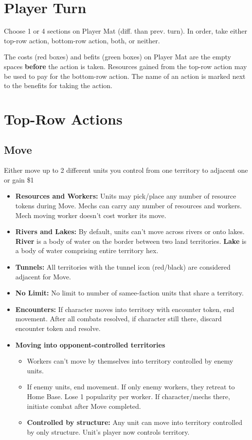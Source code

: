 \documentclass[12pt]{article}
\newenvironment{itemizeCustom}
{\begin{itemize}
  \setlength{\itemsep}{1pt}
  \setlength{\parskip}{0pt}
  \setlength{\parsep}{0pt}}
{\end{itemize}}
\begin{document}
\begin{multicols*}{2}
\section*{Player Turn}
Choose 1 or 4 sections on Player Mat (diff. than prev. turn). In order, take either top-row action, bottom-row action, both, or neither.

The costs (red boxes) and befits (green boxes) on Player Mat are the empty spaces \textbf{before} the action is taken. Resources gained from the top-row action may be used to pay for the bottom-row action. The name of an action is marked next to the benefits for taking the action.

\section*{Top-Row Actions}
\subsection*{Move}
Either move up to 2 different units you control from one territory to adjacent one or gain \$1

\begin{itemizeCustom}
    \item \textbf{Resources and Workers:} Units may pick/place any number of resource tokens during Move. Mechs can carry any number of resources and workers. Mech moving worker doesn't cost worker its move.
    \item \textbf{Rivers and Lakes:}  By default, units can't move across rivers or onto lakes. \textbf{River} is a body of water on the border between two land territories. \textbf{Lake} is a body of water comprising entire territory hex.
    \item \textbf{Tunnels:} All territories with the tunnel icon (red/black) are considered adjacent for Move.
    \item \textbf{No Limit:} No limit to number of samee-faction units that share a territory.
    \item \textbf{Encounters:} If character moves into territory with encounter token, end movement. After all combats resolved, if character still there, discard encounter token and resolve.
    \item \textbf{Moving into opponent-controlled territories}
        \begin{itemizeCustom}
            \item Workers can't move by themselves into territory controlled by enemy units.
            \item If enemy units, end movement. If only enemy workers, they retreat to Home Base. Lose 1 popularity per worker. If character/mechs there, initiate combat after Move completed.
            \item \textbf{Controlled by structure:} Any unit can move into territory controlled by only structure. Unit's player now controls territory.
        \end{itemizeCustom}
\end{itemizeCustom}


\end{multicols*}
\end{document}
